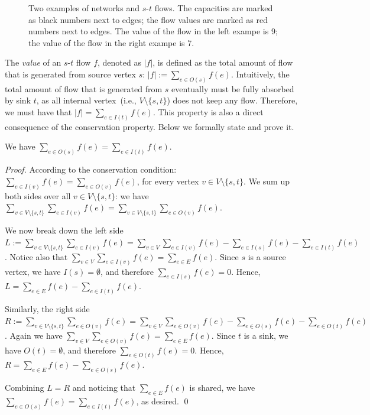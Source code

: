 \begin{figure}[h]
\centering{}
\caption{Two examples of networks and $s$-$t$ flows.
The capacities are marked as black numbers next to edges;
the flow values are marked as red numbers next to edges.
The value of the flow in the left exampe is 9;
the value of the flow in the right exampe is 7.}
\label{fig:flow}
\end{figure}

The \emph{value} of an $s$-$t$ flow $f$, denoted as $|f|$,
is defined as the total amount of flow that is generated from source vertex $s$:
$|f| := \sum_{e\in O(s)} f(e)$. Intuitively, the total amount of flow that is generated
from $s$ eventually must be fully absorbed by sink $t$, as all internal vertex~(i.e., $V\setminus\{s,t\}$)
does not keep any flow. Therefore, we must have that 
$|f| = \sum_{e\in I(t)} f(e)$.  
This property is also a direct consequence of the conservation property.
Below we formally state and prove it.

\begin{fact}
We have $\sum_{e\in O(s)} f(e) = \sum_{e\in I(t)} f(e)$. 
\end{fact}

\emph{Proof.} According to the conservation condition:
$\sum_{e\in I(v)} f(e) = \sum_{e\in O(v)} f(e)$, 
for every vertex $v\in V\setminus\{s,t\}$. 
We sum up both sides over all $v\in V\setminus\{s,t\}$: 
we have $\sum_{v\in V\setminus\{s,t\}} \sum_{e\in I(v)} f(e) = \sum_{v\in V\setminus\{s,t\}} \sum_{e\in O(v)} f(e)$. 

We now break down the left side 
$L := \sum_{v\in V\setminus\{s,t\}} \sum_{e\in I(v)} f(e) 
= \sum_{v\in V} \sum_{e\in I(v)} f(e) -  \sum_{e\in I(s)} f(e) - \sum_{e\in I(t)} f(e)$.
Notice also that $\sum_{v\in V} \sum_{e\in I(v)} f(e) = \sum_{e\in E} f(e)$.
Since $s$ is a source vertex, we have $I(s) = \emptyset$, and therefore $\sum_{e\in I(s)} f(e)  = 0$.
Hence, $L = \sum_{e\in E} f(e) - \sum_{e\in I(t)} f(e)$.

Similarly, the right side 
$R := \sum_{v\in V\setminus\{s,t\}} \sum_{e\in O(v)} f(e) 
= \sum_{v\in V} \sum_{e\in O(v)} f(e) -  \sum_{e\in O(s)} f(e) - \sum_{e\in O(t)} f(e)$.
Again we have $\sum_{v\in V} \sum_{e\in O(v)} f(e) = \sum_{e\in E} f(e)$.
Since $t$ is a sink, we have $O(t) = \emptyset$, and therefore $\sum_{e\in O(t)} f(e)  = 0$.
Hence, $R = \sum_{e\in E} f(e) - \sum_{e\in O(s)} f(e)$.

Combining $L = R$ and noticing that $\sum_{e\in E} f(e)$ is shared, we have $\sum_{e\in O(s)} f(e) = \sum_{e\in I(t)} f(e)$, as desired.  \qed

